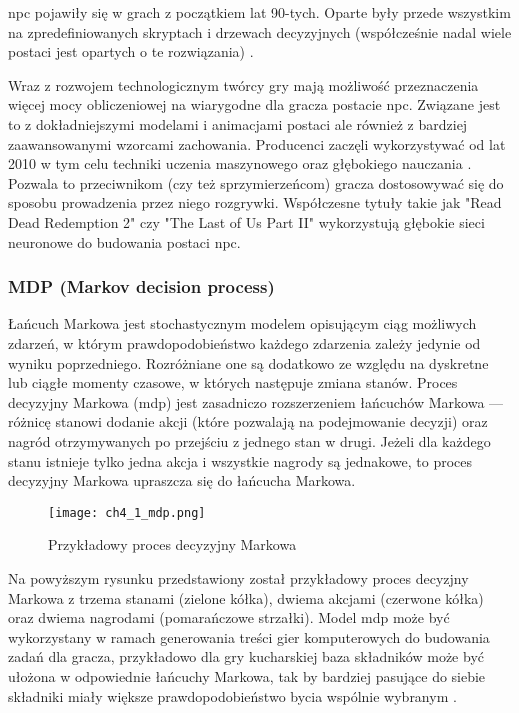\gls{npc} pojawiły się w grach z początkiem lat 90-tych. Oparte były przede wszystkim na zpredefiniowanych
skryptach i drzewach decyzyjnych\cite{storytelling_through} (współcześnie nadal wiele postaci jest
opartych o te rozwiązania) \cite{from_pong_to_narrative}.

Wraz z rozwojem technologicznym twórcy gry mają możliwość przeznaczenia więcej mocy obliczeniowej
na wiarygodne dla gracza postacie \gls{npc}. Związane jest to z dokładniejszymi modelami i animacjami
postaci ale również z bardziej zaawansowanymi wzorcami zachowania. Producenci zaczęli wykorzystywać
od lat 2010 w tym celu techniki uczenia maszynowego oraz głębokiego nauczania
\cite{from_pong_to_narrative}. Pozwala to przeciwnikom (czy też sprzymierzeńcom) gracza
dostosowywać się do sposobu prowadzenia przez niego rozgrywki. Współczesne tytuły takie jak
"Read Dead Redemption 2" czy "The Last of Us Part II" wykorzystują głębokie sieci neuronowe do
budowania postaci \gls{npc}\cite{from_pong_to_narrative}.

\subsubsection*{MDP (Markov decision process)}

Łańcuch Markowa jest stochastycznym modelem opisującym ciąg możliwych zdarzeń, w którym
prawdopodobieństwo każdego zdarzenia zależy jedynie od wyniku poprzedniego. Rozróżniane one
są dodatkowo ze względu na dyskretne lub ciągłe momenty czasowe, w których następuje zmiana
stanów. Proces decyzyjny Markowa (\gls{mdp}) jest zasadniczo rozszerzeniem łańcuchów Markowa ---
różnicę stanowi dodanie akcji (które pozwalają na podejmowanie decyzji) oraz nagród otrzymywanych
po przejściu z jednego stan w drugi. Jeżeli dla każdego stanu istnieje tylko jedna akcja i
wszystkie nagrody są jednakowe, to proces decyzyjny Markowa upraszcza się do łańcucha Markowa.

\begin{figure}[h]
    \centering
    \texttt{[image: ch4\_1\_mdp.png]}
    \caption{Przykładowy proces decyzyjny Markowa}
    \label{fig:ch4_1_mdp}
\end{figure}

Na powyższym rysunku przedstawiony został przykładowy proces decyzjny Markowa z trzema stanami (zielone
kółka), dwiema akcjami (czerwone kółka) oraz dwiema nagrodami (pomarańczowe strzałki). Model \gls{mdp} może
być wykorzystany w ramach generowania treści gier komputerowych do budowania zadań dla gracza,
przykładowo dla gry kucharskiej baza składników może być ułożona w odpowiednie łańcuchy Markowa, tak
by bardziej pasujące do siebie składniki miały większe prawdopodobieństwo bycia wspólnie wybranym
\cite{ammanabrolu2020automated}.

